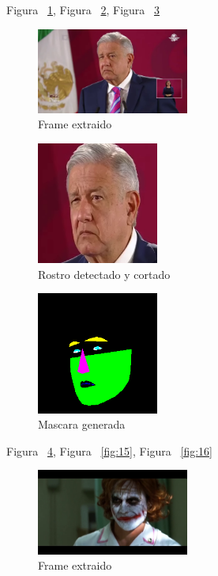 \documentclass[10pt,journal,compsoc]{IEEEtran}\usepackage[T1]{fontenc}                              %
\begin{document}
Figura ~\ref{fig:11}, Figura ~\ref{fig:12}, Figura ~\ref{fig:13}

\begin{figure}[!htb]
  \begin{center}
    \includegraphics[width=5cm]{./imgs/13_01_frame.png}
    \caption{Frame extraido}
    \label{fig:11}
  \end{center}
\end{figure}

\begin{figure}[!htb]
  \begin{center}
    \includegraphics[width=4cm]{./imgs/13_02_rostro.png}
    \caption{Rostro detectado y cortado}
    \label{fig:12}
  \end{center}
\end{figure}

\begin{figure}[!htb]
  \begin{center}
    \includegraphics[width=4cm]{./imgs/13_03_mascara.png}
    \caption{Mascara generada}
    \label{fig:13}
  \end{center}
\end{figure}

Figura ~\ref{fig:14}, Figura ~\ref{fig:15}, Figura ~\ref{fig:16}

\begin{figure}[!htb]
  \begin{center}
    \includegraphics[width=5cm]{./imgs/14_01_frame.png}
    \caption{Frame extraido}
    \label{fig:14}
  \end{center}
\end{figure}
\end{document}
